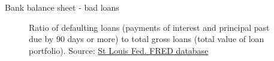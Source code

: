 \begin{frame}{Bank balance sheet - bad loans}

\begin{figure}
\begin{center}


\caption{\label{fig:L4_NPL_to_total_loans} Ratio of defaulting loans (payments of interest and principal past due by 90 days or more) to total gross loans (total value of loan portfolio). Source: \href{https://fred.stlouisfed.org/series/DDSI02USA156NWDB}{St Louis Fed. FRED database}}

\end{center}
\end{figure}

\end{frame}



